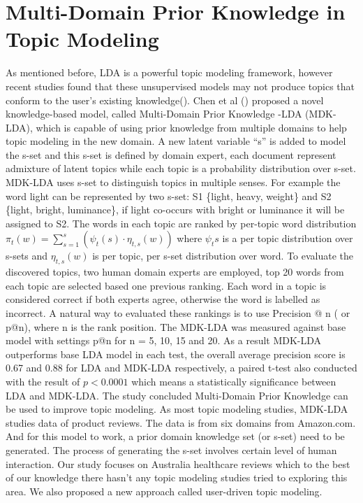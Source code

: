 \documentclass[11pt,twoside]{report}
\begin{document}
\section{Multi-Domain Prior Knowledge in Topic Modeling}
As mentioned before, LDA is a powerful topic modeling framework, however recent 
studies found that these unsupervised models may not produce topics that conform to 
the user's existing knowledge(\cite{ref24}). Chen et al (\cite{ref24}) proposed a 
novel knowledge-based model, called Multi-Domain Prior Knowledge -LDA (MDK-LDA), which is capable of using prior knowledge 
from multiple domains to help topic modeling in the new domain. 
A new latent variable ``s'' is added to model the s-set and this s-set is defined by domain expert, each document represent 
admixture of latent topics while each topic is a probability distribution over s-set. 
MDK-LDA uses s-set to distinguish topics in multiple senses. 
For example the word light can be represented by two s-set: S1 \{light, heavy, weight\} and S2 \{light, bright, luminance\}, if light co-occurs with bright or 
luminance it will be assigned to S2.
The words in each topic are ranked by per-topic word distribution $\pi _{t}(w) = \sum_{s=1}^s (\psi_{t}(s)\cdot \eta_{t,s}(w) )$ where $\psi_t{s}$ is a per topic distribution over s-sets and $\eta_{t,s}(w)$ is per topic, per s-set distribution over word. To evaluate the discovered topics, two human domain experts are employed, top 20 words from each topic are selected based one previous ranking. Each word in a topic is considered correct if both experts agree, otherwise the word is labelled as incorrect. A natural way to evaluated these rankings is to use Precision @ n ( or p@n), where n is the rank position. The MDK-LDA was measured against base model with settings p@n for n = 5, 10, 15 and 20. As a result MDK-LDA outperforms base LDA model in each test, the overall average precision score is 0.67 and 0.88 for LDA and MDK-LDA respectively, a paired t-test also conducted with the result of $p < 0.0001$ which means a statistically significance  between LDA and MDK-LDA. The study concluded Multi-Domain Prior Knowledge can be used to improve topic modeling. 
As most topic modeling studies, MDK-LDA studies data of product reviews. The data is from six domains from Amazon.com. And for this model to work, a prior domain knowledge set (or s-set) need to be generated. The process of generating the s-set involves certain level of human interaction. Our study focuses on Australia healthcare reviews which to the best of our knowledge there hasn't any topic modeling studies tried to exploring this area. We also proposed a new approach called user-driven topic modeling.
\end{document}
